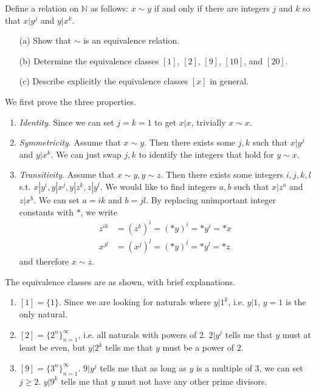   \begin{exercise}
    Define a relation on $\mathbb{N}$ as follows: $x \sim y$ if and only if there are integers $j$ and $k$ so that $x|y^j$ and $y|x^k$.
    \begin{enumerate}
      \item[(a)] Show that $\sim$ is an equivalence relation.
      \item[(b)] Determine the equivalence classes $[1]$, $[2]$, $[9]$, $[10]$, and $[20]$.
      \item[(c)] Describe explicitly the equivalence classes $[x]$ in general.
    \end{enumerate}
  \end{exercise}
  \begin{solution}
    We first prove the three properties. 
    \begin{enumerate}
      \item \textit{Identity}. Since we can set $j = k = 1$ to get $x | x$, trivially $x \sim x$. 
      \item \textit{Symmetricity}. Assume that $x \sim y$. Then there exists some $j, k$ such that $x | y^j$ and $y | x^k$. We can just swap $j, k$ to identify the integers that hold for $y \sim x$. 
      \item \textit{Transitivity}. Assume that $x \sim y, y \sim z$. Then there exists some integers $i, j, k, l$ s.t. $x | y^i, y | x^j, y | z^k, z | y^l$. We would like to find integers $a, b$ such that $x | z^a$ and $z | x^b$. We can set $a = ik$ and $b = jl$. By replacing unimportant integer constants with $\ast$, we write 
      \begin{align}
        z^{ik} & = (z^k)^i = (\ast y)^i = \ast y^i = \ast x \\
        x^{jl} & = (x^j)^l = (\ast y)^l = \ast y^l = \ast z
      \end{align}
      and therefore $x \sim z$. 
    \end{enumerate}
    The equivalence classes are as shown, with brief explanations. 
    \begin{enumerate}
      \item $[1] = \{1\}$. Since we are looking for naturals where $y | 1^k$, i.e. $y | 1$, $y = 1$ is the only natural. 
      \item $[2] = \{2^n\}_{n=1}^\infty$, i.e. all naturals with powers of $2$. $2 | y^j$ tells me that $y$ must at least be even, but $y | 2^k$ tells me that $y$ must be a power of $2$. 
      \item $[9] = \{3^n\}_{n=1}^\infty$. $9 | y^j$ tells me that as long as $y$ is a multiple of $3$, we can set $j \geq 2$. $y | 9^k$ tells me that $y$ must not have any other prime divisors. 

\end{enumerate}
\end{solution}
